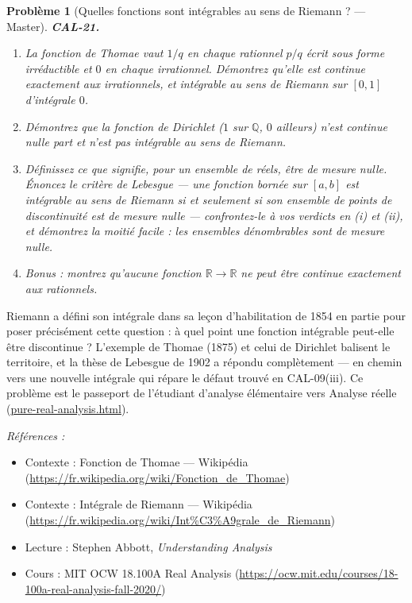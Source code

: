 \documentclass[11pt]{article}
\newtheorem{problem}{Problème}
\newenvironment{refs}{\par\small\noindent\emph{Références :}\begin{itemize}\setlength\itemsep{0pt}}{\end{itemize}\normalsize}
\begin{document}
\begin{problem}[{Quelles fonctions sont intégrables au sens de Riemann ? --- Master}]
\textbf{CAL-21.} \begin{enumerate}
\item[(i)] La fonction de Thomae vaut $ 1/q $ en chaque
rationnel $ p/q $ écrit sous forme irréductible et $ 0 $ en chaque irrationnel. Démontrez qu'elle est continue
exactement aux irrationnels, et intégrable au sens de Riemann sur $ [0,1] $ d'intégrale $ 0 $.
\item[(ii)] Démontrez que la fonction de Dirichlet ($ 1 $ sur $ \mathbb{Q} $, $ 0 $ ailleurs)
n'est continue nulle part et n'est pas intégrable au sens de Riemann.
\item[(iii)] Définissez ce que signifie, pour un ensemble de
réels, être de mesure nulle. Énoncez le critère de Lebesgue --- une fonction bornée sur
$ [a,b] $ est intégrable au sens de Riemann si et seulement si son ensemble de points de discontinuité est de mesure
nulle --- confrontez-le à vos verdicts en (i) et (ii), et démontrez la moitié facile :
les ensembles dénombrables sont de mesure nulle.
\item[(iv)] Bonus : montrez qu'aucune fonction
$ \mathbb{R}\to\mathbb{R} $ ne peut être continue exactement aux rationnels.
\end{enumerate}

\end{problem}

\noindent Riemann a défini son intégrale dans sa leçon d'habilitation de 1854 en partie pour
poser précisément cette question : à quel point une fonction intégrable peut-elle être discontinue ? L'exemple de
Thomae (1875) et celui de Dirichlet balisent le territoire, et la thèse de Lebesgue de 1902
a répondu complètement --- en chemin vers une nouvelle intégrale qui répare le défaut trouvé en
CAL-09(iii). Ce problème est le passeport de l'étudiant d'analyse élémentaire vers
Analyse réelle (\url{pure-real-analysis.html}).

\begin{refs}
\item Contexte : Fonction de Thomae --- Wikipédia (\url{https://fr.wikipedia.org/wiki/Fonction_de_Thomae})
\item Contexte : Intégrale de Riemann --- Wikipédia (\url{https://fr.wikipedia.org/wiki/Int%C3%A9grale_de_Riemann})
\item Lecture : Stephen Abbott, \textit{Understanding Analysis}
\item Cours : MIT OCW 18.100A Real Analysis (\url{https://ocw.mit.edu/courses/18-100a-real-analysis-fall-2020/})
\end{refs}
\end{document}
